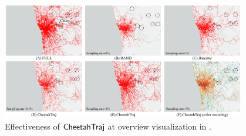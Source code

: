 
\begin{figure}[t]
	\centering
	\includegraphics[width=0.95\textwidth]{pictures/case_study_icde/case_study_overview.pdf}
	\vspace{-3mm}
	\caption{Effectiveness of $\mathsf{CheetahTraj}$ at overview visualization in \pt{}.}
	\label{fig:overview}
	\vspace{-2mm}
\end{figure}


